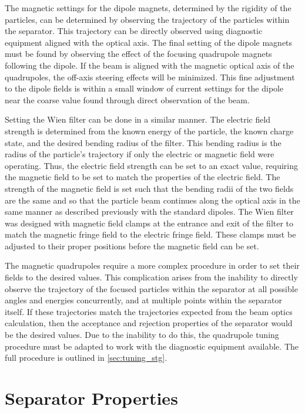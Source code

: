 The magnetic settings for the dipole magnets, determined by the rigidity
of the particles, can be determined by observing the trajectory of the
particles within the separator. This trajectory can be directly observed
using diagnostic equipment aligned with the optical axis. The final
setting of the dipole magnets must be found by observing the effect of
the focusing quadrupole magnets following the dipole. If the beam is
aligned with the magnetic optical axis of the quadrupoles, the off-axis
steering effects will be minimized. This fine adjustment to the dipole
fields is within a small window of current settings for the dipole near
the coarse value found through direct observation of the beam.

Setting the Wien filter can be done in a similar manner. The electric
field strength is determined from the known energy of the particle, the
known charge state, and the desired bending radius of the filter. This
bending radius is the radius of the particle's trajectory if only the
electric or magnetic field were operating. Thus, the electric field
strength can be set to an exact value, requiring the magnetic field to
be set to match the properties of the electric field. The strength of
the magnetic field is set such that the bending radii of the two fields
are the same and so that the particle beam continues along the optical
axis in the same manner as described previously with the standard
dipoles. The Wien filter was designed with magnetic field clamps at the
entrance and exit of the filter to match the magnetic fringe field to
the electric fringe field. These clamps must be adjusted to their proper
positions before the magnetic field can be set.

The magnetic quadrupoles require a more complex procedure in order to
set their fields to the desired values. This complication arises from
the inability to directly observe the trajectory of the focused
particles within the separator at all possible angles and energies
concurrently, and at multiple points within the separator itself. If
these trajectories match the trajectories expected from the beam optics
calculation, then the acceptance and rejection properties of the
separator would be the desired values. Due to the inability to do this,
the quadrupole tuning procedure must be adapted to work with the
diagnostic equipment available. The full procedure is outlined in
\ref{sec:tuning_stg}.


\section{Separator Properties}

